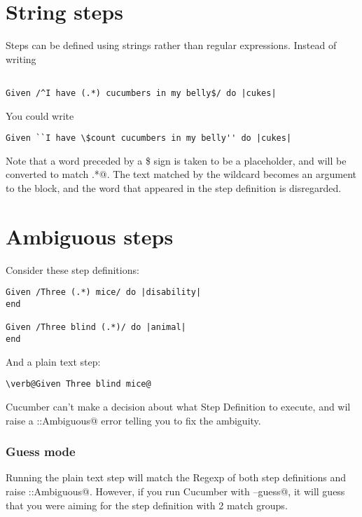 \section{String steps}

Steps can be defined using strings rather than regular expressions. Instead of writing

\begin{verbatim}

Given /^I have (.*) cucumbers in my belly$/ do |cukes|

\end{verbatim}
You could write
\begin{verbatim}
Given ``I have \$count cucumbers in my belly'' do |cukes|

\end{verbatim}

Note that a word preceded by a \$ sign is taken to be a placeholder, and will be converted to match \verb@.*@. The text matched by the wildcard becomes an argument to the block, and the word that appeared in the step definition is disregarded.

\section{Ambiguous steps}

Consider these step definitions:

\begin{verbatim}
Given /Three (.*) mice/ do |disability|
end

Given /Three blind (.*)/ do |animal|
end

\end{verbatim}
And a plain text step:

\begin{verbatim}
\verb@Given Three blind mice@
\end{verbatim}
Cucumber can't make a decision about what Step Definition to execute, and wil raise a \verb@Cucumber::Ambiguous@ error telling you to fix the ambiguity.

\subsubsection{Guess mode}

Running the plain text step will match the Regexp of both step definitions and raise \verb@Cucumber::Ambiguous@. However,
if you run Cucumber with \verb@--guess@, it will guess that you were aiming for the step definition with 2 match groups.


